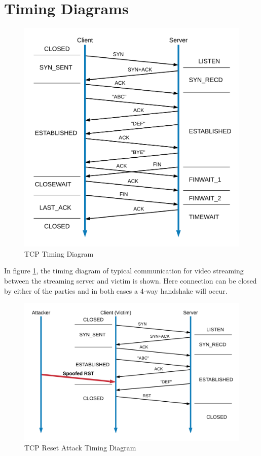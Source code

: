 \documentclass[14pt]{extarticle}
\begin{document}
\section{Timing Diagrams}
    
    \begin{figure}
    	\centering
    	\includegraphics[width=.95\textwidth]{Pictures/TCP_Timing_Diagram.png}
    	\caption{TCP Timing Diagram}
    	\label{fig:TCP_Tim}
    \end{figure}
    
    In figure \ref{fig:TCP_Tim}, the timing diagram of typical communication for video streaming between the streaming server and victim is shown. Here connection can be closed by either of the parties and in both cases a 4-way handshake will occur. 
    
    \begin{figure}
    	\centering
    	\includegraphics[width=.95\textwidth]{Pictures/TCP_RST_Timing_Diagram.png}
    	\caption{TCP Reset Attack Timing Diagram} 
    	\label{fig:RST_Attack_Tim}
    \end{figure}
    
\end{document}
